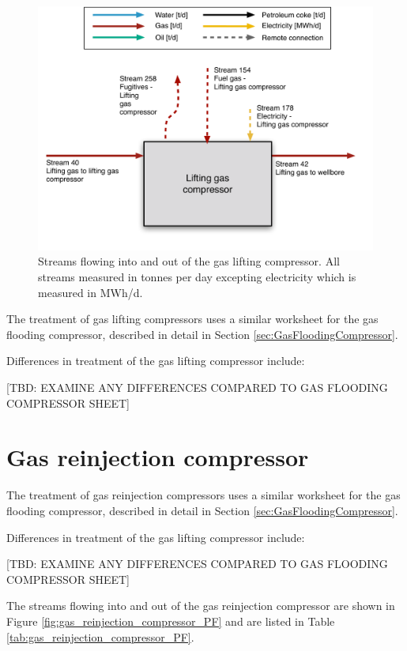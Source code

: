 \documentclass[11pt]{report}
\begin{document}
{%
\begin{figure}
\includegraphics[width=0.85\columnwidth]{images/Lifting_gas_compressor_PF.pdf}
\caption{Streams flowing into and out of the gas lifting compressor. All streams measured in tonnes per day excepting electricity which is measured in MWh/d.}
\label{fig:gas_lifting_compressor_PF}
\end{figure}


The treatment of gas lifting compressors uses a similar worksheet for the gas flooding compressor, described in detail in Section \ref{sec:GasFloodingCompressor}.

Differences in treatment of the gas lifting compressor include:

[TBD: EXAMINE ANY DIFFERENCES COMPARED TO GAS FLOODING COMPRESSOR SHEET]




\clearpage

\section{Gas reinjection compressor}
\label{sec:gas_reinjection_compressor}

The treatment of gas reinjection compressors uses a similar worksheet for the gas flooding compressor, described in detail in Section \ref{sec:GasFloodingCompressor}.

Differences in treatment of the gas lifting compressor include:

[TBD: EXAMINE ANY DIFFERENCES COMPARED TO GAS FLOODING COMPRESSOR SHEET]

The streams flowing into and out of the gas reinjection compressor are shown in Figure \ref{fig:gas_reinjection_compressor_PF} and are listed in Table \ref{tab:gas_reinjection_compressor_PF}.


}
\end{document}
